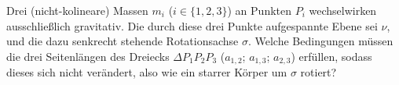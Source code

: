 \begin{minipage}[b]{0.7\textwidth}

\begin{Exercise}[label  = rotierendes 3-Körper-Problem, difficulty = 4, label = cmrot, origin = {XX. IPhO 1989}, title = Starrer Körper]
	Drei (nicht-kolineare) Massen $m_i$ ($i \in \{1,2,3\}$) an Punkten $P_i$ wechselwirken ausschließlich gravitativ. Die durch diese drei Punkte aufgespannte Ebene sei $\nu$, und die dazu senkrecht stehende Rotationsachse $\sigma$. Welche Bedingungen müssen die drei Seitenlängen des Dreiecks $\Delta P_1P_2P_3$ ($a_{1,2}$; $a_{1,3}$; $a_{2,3}$) erfüllen, sodass dieses sich nicht verändert, also wie ein starrer Körper um $\sigma$ rotiert?
\end{Exercise}
\end{minipage}
\begin{minipage}[b]{0.3\textwidth}
	\centering
{}
\end{minipage}
